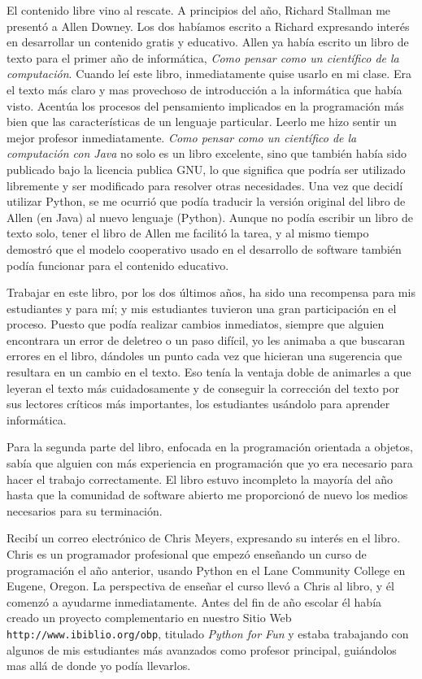 El contenido libre vino al rescate.  A principios del año, Richard Stallman me presentó a Allen Downey.  Los dos habíamos escrito a Richard expresando 
interés en desarrollar un contenido gratis y educativo.  Allen ya había
escrito un libro de texto para el primer año de informática, {\em Como pensar
como un científico de la computación}.  Cuando leí este libro, inmediatamente quise
 usarlo en mi clase.  Era el texto más claro y mas provechoso de introducción a 
la informática que había visto.  Acentúa los procesos del pensamiento
implicados en la programación más bien que las características de un
 lenguaje particular.  Leerlo me hizo sentir un  mejor profesor inmediatamente.
{\em Como pensar como un científico de la computación con Java} no solo es un libro excelente, sino 
que también había sido publicado bajo la licencia publica GNU, lo que significa que podría ser utilizado
 libremente y ser modificado para resolver otras necesidades.  Una vez que decidí utilizar Python, se me ocurrió que
podía traducir la versión original  del libro de Allen (en Java) al nuevo
lenguaje (Python). Aunque no podía escribir un libro de texto solo, tener el
libro de Allen me facilitó la tarea, y al mismo tiempo
demostró que el modelo cooperativo usado en el desarrollo de software
también podía  funcionar para el contenido educativo.

Trabajar en este libro, por los dos últimos años, ha sido una recompensa para
mis estudiantes y para mí; y mis estudiantes tuvieron una gran participación en el proceso. Puesto que podía 
realizar cambios inmediatos, siempre que alguien encontrara 
un error de deletreo o un paso difícil, yo les animaba a que buscaran
errores en el libro, dándoles un punto cada vez que hicieran una sugerencia que 
resultara en un cambio en el texto. Eso tenía la ventaja doble de animarles a que 
leyeran el texto más cuidadosamente y de conseguir la corrección del texto por sus 
lectores críticos más importantes, los estudiantes usándolo para aprender 
informática. 
 
Para la segunda parte del libro, enfocada en la programación orientada a objetos, sabía que 
alguien con más experiencia en programación que yo era necesario para hacer el trabajo 
correctamente. El libro estuvo  incompleto la mayoría del año hasta que la 
comunidad de software abierto  me proporcionó de nuevo los medios necesarios para su terminación.

Recibí un correo electrónico de Chris Meyers, expresando su interés en el libro. 
Chris es un programador profesional que empezó enseñando un curso de programación 
el año anterior, usando Python en el Lane Community College en Eugene, Oregon.  La
perspectiva de enseñar el curso llevó a Chris al libro, y él comenzó a ayudarme
 inmediatamente.  Antes del fin de año escolar él había creado un proyecto 
complementario en nuestro Sitio Web \texttt{http://www.ibiblio.org/obp}, titulado 
{\em Python for Fun} y estaba trabajando con algunos de mis estudiantes más
avanzados como profesor principal, guiándolos mas allá de donde yo podía 
llevarlos.

